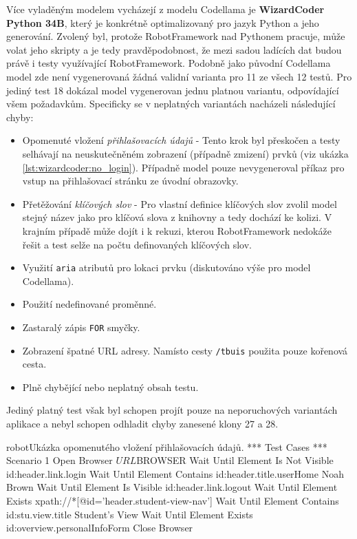 \documentclass[czech, ma, kiv, he, iso690numb, pdf, viewonly]{fasthesis}
\begin{document}
            Více vyladěným modelem vycházejí z modelu Codellama je \textbf{WizardCoder Python 34B}, který je konkrétně optimalizovaný pro jazyk Python a jeho generování. Zvolený byl, protože RobotFramework nad Pythonem pracuje, může volat jeho skripty a je tedy pravděpodobnost, že mezi sadou ladících dat budou právě i testy využívající RobotFramework. Podobně jako původní Codellama model zde není vygenerovaná žádná validní varianta pro 11 ze všech 12 testů. Pro jediný test 18 dokázal model vygenerovan jednu platnou variantu, odpovídající všem požadavkům. Specificky se v neplatných variantách nacházeli následující chyby:
            \begin{itemize}
                \item Opomenuté vložení \textit{přihlašovacích údajů} - Tento krok byl přeskočen a testy selhávají na neuskutečněném zobrazení (případně zmizení) prvků (viz ukázka \ref{lst:wizardcoder:no_login}). Případně model pouze nevygeneroval příkaz pro vstup na přihlašovací stránku ze úvodní obrazovky.
                \item Přetěžování \textit{klíčových slov} - Pro vlastní definice klíčových slov zvolil model stejný název jako pro klíčová slova z knihovny a tedy dochází ke kolizi. V krajním případě může dojít i k rekuzi, kterou RobotFramework nedokáže řešit a test selže na počtu definovaných klíčových slov.
                \item Využití \verb|aria| atributů pro lokaci prvku (diskutováno výše pro model Codellama).
                \item Použití nedefinované proměnné.
                \item Zastaralý zápis \verb|FOR| smyčky.
                \item Zobrazení špatné URL adresy. Namísto cesty \verb|/tbuis| použita pouze kořenová cesta.
                \item Plně chybějící nebo neplatný obsah testu.
            \end{itemize}
            \noindent Jediný platný test však byl schopen projít pouze na neporuchových variantách aplikace a nebyl schopen odhladit chyby zanesené klony 27 a 28.

            \begin{code}{robot}{Ukázka opomenutého vložení přihlašovacích údajů. \label{lst:wizardcoder:no_login}}
*** Test Cases ***
Scenario 1
    Open Browser    ${URL}    ${BROWSER}
    Wait Until Element Is Not Visible    id:header.link.login
    Wait Until Element Contains    id:header.title.userHome    Noah Brown
    Wait Until Element Is Visible    id:header.link.logout
    Wait Until Element Exists    xpath://*[@id='header.student-view-nav']
    Wait Until Element Contains    id:stu.view.title    Student's View
    Wait Until Element Exists    id:overview.personalInfoForm
    Close Browser
            \end{code}
\end{document}

